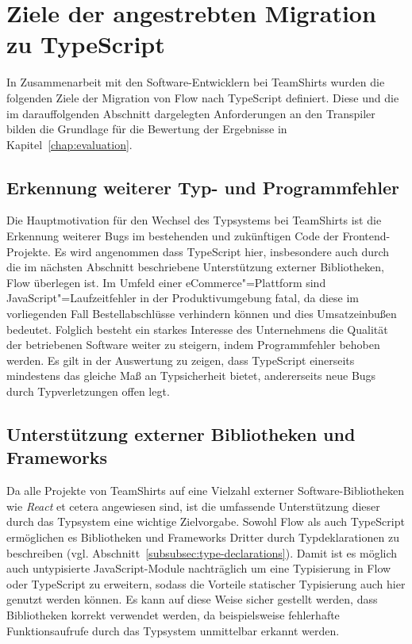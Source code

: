 \section{Ziele der angestrebten Migration zu TypeScript}
\label{analysis:goals}

In Zusammenarbeit mit den Software-Entwicklern bei TeamShirts wurden die folgenden Ziele der Migration von Flow nach TypeScript definiert. Diese und die im darauffolgenden Abschnitt dargelegten Anforderungen an den Transpiler bilden die Grundlage für die Bewertung der Ergebnisse in Kapitel~\ref{chap:evaluation}.

\subsection{Erkennung weiterer Typ- und Programmfehler}

Die Hauptmotivation für den Wechsel des Typsystems bei TeamShirts ist die Erkennung weiterer Bugs im bestehenden und zukünftigen Code der Frontend-Projekte. Es wird angenommen dass TypeScript hier, insbesondere auch durch die im nächsten Abschnitt beschriebene Unterstützung externer Bibliotheken, Flow überlegen ist. Im Umfeld einer eCommerce"=Plattform sind JavaScript"=Laufzeitfehler in der Produktivumgebung fatal, da diese im vorliegenden Fall Bestellabschlüsse verhindern können und dies Umsatzeinbußen bedeutet. Folglich besteht ein starkes Interesse des Unternehmens die Qualität der betriebenen Software weiter zu steigern, indem Programmfehler behoben werden. Es gilt in der Auswertung zu zeigen, dass TypeScript einerseits mindestens das gleiche Maß an Typsicherheit bietet, andererseits neue Bugs durch Typverletzungen offen legt.

\subsection{Unterstützung externer Bibliotheken und Frameworks}

Da alle Projekte von TeamShirts auf eine Vielzahl externer Software-Bibliotheken wie \textit{React} et cetera angewiesen sind, ist die umfassende Unterstützung dieser durch das Typsystem eine wichtige Zielvorgabe. Sowohl Flow als auch TypeScript ermöglichen es Bibliotheken und Frameworks Dritter durch Typdeklarationen zu beschreiben (vgl. Abschnitt~\ref{subsubsec:type-declarations}). Damit ist es möglich auch untypisierte JavaScript-Module nachträglich um eine Typisierung in Flow oder TypeScript zu erweitern, sodass die Vorteile statischer Typisierung auch hier genutzt werden können. Es kann auf diese Weise sicher gestellt werden, dass Bibliotheken korrekt verwendet werden, da beispielsweise fehlerhafte Funktionsaufrufe durch das Typsystem unmittelbar erkannt werden.

